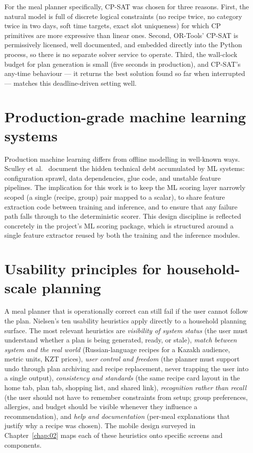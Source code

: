 For the meal planner specifically, CP-SAT was chosen for three reasons. First, the natural model is full of discrete logical constraints (no recipe twice, no category twice in two days, soft time targets, exact slot uniqueness) for which CP primitives are more expressive than linear ones. Second, OR-Tools' CP-SAT is permissively licensed, well documented, and embedded directly into the Python process, so there is no separate solver service to operate. Third, the wall-clock budget for plan generation is small (five seconds in production), and CP-SAT's any-time behaviour --- it returns the best solution found so far when interrupted --- matches this deadline-driven setting well.

\section{Production-grade machine learning systems}

Production machine learning differs from offline modelling in well-known ways. Sculley et al.\ \cite{sculley2015} document the hidden technical debt accumulated by ML systems: configuration sprawl, data dependencies, glue code, and unstable feature pipelines. The implication for this work is to keep the ML scoring layer narrowly scoped (a single (recipe, group) pair mapped to a scalar), to share feature extraction code between training and inference, and to ensure that any failure path falls through to the deterministic scorer. This design discipline is reflected concretely in the project's ML scoring package, which is structured around a single feature extractor reused by both the training and the inference modules.

\section{Usability principles for household-scale planning}

A meal planner that is operationally correct can still fail if the user cannot follow the plan. Nielsen's ten usability heuristics \cite{nielsen2024shneiderman} apply directly to a household planning surface. The most relevant heuristics are \emph{visibility of system status} (the user must understand whether a plan is being generated, ready, or stale), \emph{match between system and the real world} (Russian-language recipes for a Kazakh audience, metric units, KZT prices), \emph{user control and freedom} (the planner must support undo through plan archiving and recipe replacement, never trapping the user into a single output), \emph{consistency and standards} (the same recipe card layout in the home tab, plan tab, shopping list, and shared link), \emph{recognition rather than recall} (the user should not have to remember constraints from setup; group preferences, allergies, and budget should be visible whenever they influence a recommendation), and \emph{help and documentation} (per-meal explanations that justify why a recipe was chosen). The mobile design surveyed in Chapter~\ref{chap:02} maps each of these heuristics onto specific screens and components.


